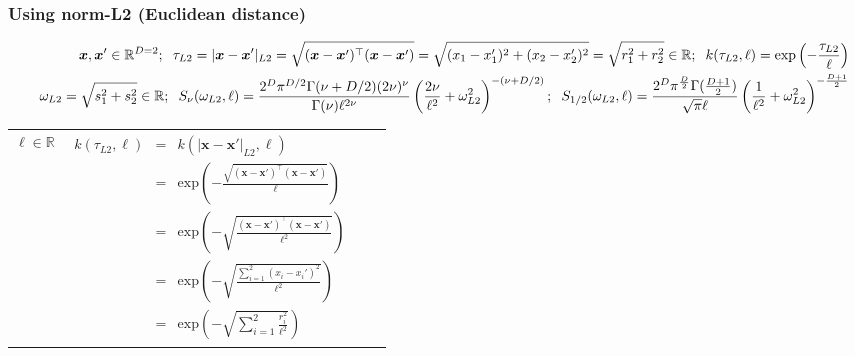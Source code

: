 \documentclass[onecolumn,a4paper,11pt]{article}
\begin{document}
\begin{landscape}
\subsubsection{Using norm-L2 (Euclidean distance)}
\vspace{-8mm}

\begin{table}[H]
\small
\begin{eqnarray*}
\vspace{-20mm}
&&\bm{x}, \bm{x}' \in \mathbb{R}^{D=2}; \hspace{2mm}\tau_{L2} =|\bm{x}-\bm{x}'|_{L2} = \sqrt{(\bm{x}-\bm{x}')^\top(\bm{x}-\bm{x}')} = \sqrt{(x_1-x_1')^2+(x_2-x_2')^2}  = \sqrt{r_1^2+r_2^2} \in \mathbb{R}; \hspace{2mm} k(\tau_{L2},\ell) = \mathrm{exp}\left(- \frac{\tau_{L2}}{\ell} \right)\\
&& \omega_{L2}= \sqrt{s_1^2+s_2^2} \in \mathbb{R}; \hspace{2mm} S_{\nu}(\omega_{L2},\ell) = \frac{2^D\pi^{D/2}\Gamma(\nu+D/2)(2\nu)^{\nu}}{\Gamma(\nu)\ell^{2\nu}}\left(\frac{2\nu}{\ell^2}+\omega_{L2}^2 \right)^{-(\nu+D/2)}; \hspace{2mm} S_{1/2}(\omega_{L2},\ell) = \frac{2^D\pi^{\frac{D}{2}}\Gamma(\frac{D+1}{2})}{\sqrt{\pi}\ell}\left(\frac{1}{\ell^2}+\omega_{L2}^2 \right)^{-\frac{D+1}{2}}
\end{eqnarray*}
\normalsize
  \begin{center}
    \begin{tabular}{|c|c|c|c|}
       \hline
       
       \multicolumn{1}{|p{1.5cm}|}{
       \vspace{1mm}
       $\ell \in \mathbb{R}$
       }
       
        & \multicolumn{1}{|p{7.2cm}|}{\small
         \begin{eqnarray*}
		k(\tau_{L2},\ell) &=& k(|\bm{x}-\bm{x}'|_{L2},\ell)\\
		 &=& \mathrm{exp}\left(- \frac{\sqrt{(\bm{x}-\bm{x}')^\top(\bm{x}-\bm{x}')}}{\ell} \right)\\
		&=& \mathrm{exp}\left(- \sqrt{\frac{(\bm{x}-\bm{x}')^\top(\bm{x}-\bm{x}')}{\ell^2}} \right)\\
		&=& \mathrm{exp}\left(- \sqrt{\frac{\sum_{i=1}^{2}(x_i-x_i')^2}{\ell^2}} \right) \\
		&=& \mathrm{exp}\left(-\sqrt{ \sum_{i=1}^{2}\frac{r_i^2}{\ell^2}} \right)
         \end{eqnarray*}
       }
       

\end{tabular}
\end{center}
\end{table}
\end{landscape}
\end{document}
